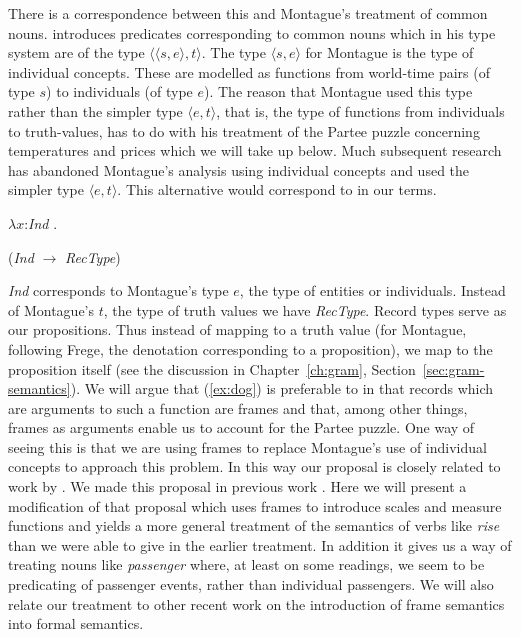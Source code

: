 There is a correspondence between this and Montague's treatment of
common nouns.  
\cite{Montague1973} introduces predicates corresponding to common
nouns which in his type system are of the type $\langle\langle
s,e\rangle,t\rangle$.  The type $\langle s,e\rangle$ for Montague is
the type of individual concepts.  These are modelled as functions from
world-time pairs (of type $s$) to individuals (of type $e$).  The
reason that Montague used this type rather than the simpler type
$\langle e,t\rangle$, that is, the type of functions from individuals
to truth-values, has to do with his treatment of the Partee puzzle
concerning temperatures and prices which we will take up below.  Much
subsequent research has abandoned Montague's analysis using
individual concepts and used the simpler type $\langle e,t\rangle$.
This alternative would correspond to \nexteg{} in our terms.
\begin{ex} 
\begin{subex} 
 
\item $\lambda x$:\textit{Ind}
  .   
 
\item (\textit{Ind} $\rightarrow$ \textit{RecType}) 
 
\end{subex} 
   
\end{ex}
\textit{Ind} corresponds to Montague's type $e$, the type of entities
or individuals. Instead of Montague's $t$, the type of truth values we
have \textit{RecType}.  Record types serve as our propositions.  Thus
instead of mapping to a truth value (for Montague, following Frege,
the denotation corresponding to a proposition), we map to the
proposition itself (see the discussion in Chapter~\ref{ch:gram}, Section~\ref{sec:gram-semantics}).
We will argue that (\ref{ex:dog}) is preferable to \preveg{} in that records which
are arguments to such a function are frames and that, among other
things, frames as arguments enable us to account for the Partee
puzzle. One way of seeing this is that we are using frames to replace
Montague's use of individual concepts to approach this problem.  In
this way our proposal is closely related to work by \cite{Loebner2015}.  We made this proposal in previous work
\citep{Cooper2010,Cooper2012}.  Here we will present a modification of
that proposal which uses frames to introduce scales and measure
functions and yields a more general treatment of the semantics of
verbs like \textit{rise} than we were able to give in the earlier
treatment.  In addition it gives us a way of treating nouns like
\textit{passenger} where, at least on some readings, we seem to be
predicating of passenger events, rather than individual passengers.
We will also relate our treatment to other recent work on the
introduction of frame semantics into formal semantics.  

